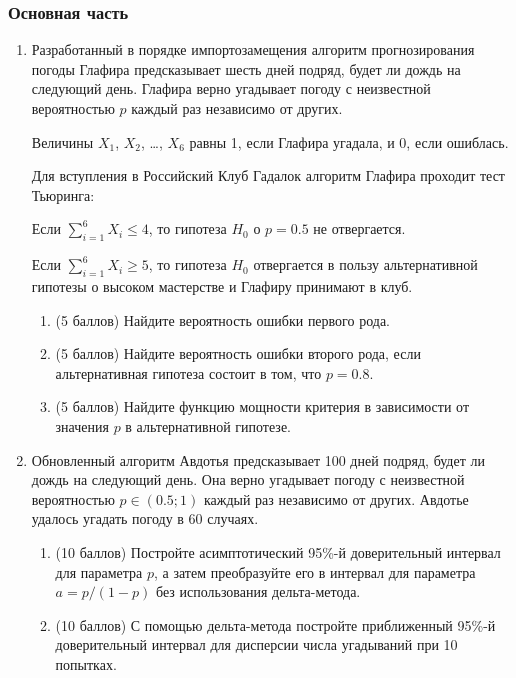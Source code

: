 \subsubsection*{Основная часть}


\begin{enumerate}
	\item Разработанный в порядке импортозамещения алгоритм прогнозирования погоды Глафира предсказывает шесть дней подряд, будет ли дождь на следующий день. Глафира верно угадывает погоду с неизвестной вероятностью $p$ каждый раз независимо от других.
	
	Величины $X_1$, $X_2$, \ldots, $X_6$ равны 1, если Глафира угадала, и 0, если ошиблась. 
	
	Для вступления в Российский Клуб Гадалок алгоритм Глафира проходит тест Тьюринга:
	
	Если $\sum_{i=1}^6 X_i \leq 4$, то гипотеза $H_0$ о $p=0.5$ не отвергается. 
	
	Если $\sum_{i=1}^6 X_i \geq 5$, то гипотеза $H_0$ отвергается в пользу альтернативной гипотезы о высоком мастерстве и Глафиру принимают в клуб.
	
	\begin{enumerate}
		\item (5 баллов) Найдите вероятность ошибки первого рода.
		\item (5 баллов) Найдите вероятность ошибки второго рода,
		если альтернативная гипотеза состоит в том, что $p=0.8$.
		\item (5 баллов) Найдите функцию мощности критерия в зависимости от значения $p$ в альтернативной гипотезе. 
	\end{enumerate}
	
	\item Обновленный алгоритм Авдотья предсказывает 100 дней подряд, будет ли дождь на следующий день. Она верно угадывает погоду с неизвестной вероятностью $p \in (0.5; 1)$ каждый раз независимо от других. 
	Авдотье удалось угадать погоду в 60 случаях. 
	
	
	\begin{enumerate}
	\item (10 баллов) Постройте асимптотический 95\%-й доверительный интервал для параметра $p$, а затем преобразуйте его в интервал для параметра $a= p/(1-p)$ без использования дельта-метода.
	\item (10 баллов) С помощью дельта-метода постройте приближенный 95\%-й доверительный интервал для дисперсии числа угадываний при 10 попытках.
	\end{enumerate}
	

\end{enumerate}
